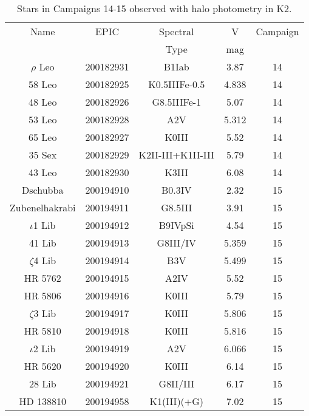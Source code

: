 \begin{table*}
\caption{Stars in Campaigns 14-15 observed with halo photometry in K2.\label{table_4}}
\begin{tabular}{ccccc}
\hline \hline
Name & EPIC & Spectral & V & Campaign \\
 &  & Type & mag &  \\
\hline
$\rho$ Leo & 200182931 & B1Iab & 3.87 & 14 \\
58 Leo & 200182925 & K0.5IIIFe-0.5 & 4.838 & 14 \\
48 Leo & 200182926 & G8.5IIIFe-1 & 5.07 & 14 \\
53 Leo & 200182928 & A2V & 5.312 & 14 \\
65 Leo & 200182927 & K0III & 5.52 & 14 \\
35 Sex & 200182929 & K2II-III+K1II-III & 5.79 & 14 \\
43 Leo & 200182930 & K3III & 6.08 & 14 \\
Dschubba & 200194910 & B0.3IV & 2.32 & 15 \\
Zubenelhakrabi & 200194911 & G8.5III & 3.91 & 15 \\
$\iota$1 Lib & 200194912 & B9IVpSi & 4.54 & 15 \\
41 Lib & 200194913 & G8III/IV & 5.359 & 15 \\
$\zeta$4 Lib & 200194914 & B3V & 5.499 & 15 \\
HR 5762 & 200194915 & A2IV & 5.52 & 15 \\
HR 5806 & 200194916 & K0III & 5.79 & 15 \\
$\zeta$3 Lib & 200194917 & K0III & 5.806 & 15 \\
HR 5810 & 200194918 & K0III & 5.816 & 15 \\
$\iota$2 Lib & 200194919 & A2V & 6.066 & 15 \\
HR 5620 & 200194920 & K0III & 6.14 & 15 \\
28 Lib & 200194921 & G8II/III & 6.17 & 15 \\
HD 138810 & 200194958 & K1(III)(+G) & 7.02 & 15 \\
\hline
\end{tabular}
\end{table*}

